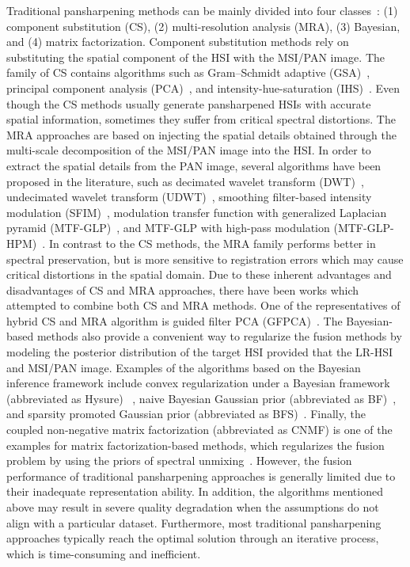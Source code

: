 \documentclass[journal]{IEEEtran}
\begin{document}
\par Traditional pansharpening methods can be mainly divided into four classes~\cite{hyperspectral_pan_review}: (1) component substitution (CS), (2) multi-resolution analysis (MRA), (3) Bayesian, and (4) matrix factorization. Component substitution methods rely on substituting the spatial component of the HSI with the MSI/PAN image. The family of CS contains algorithms such as Gram–Schmidt adaptive (GSA)~\cite{GSA, GS}, principal component analysis (PCA)~\cite{PCA_1, PCA1, PCA2}, and intensity-hue-saturation (IHS)~\cite{IHS_1}. Even though the CS methods usually generate pansharpened HSIs with accurate spatial information, sometimes they suffer from critical spectral distortions. The MRA approaches are based on injecting the spatial details obtained through the multi-scale decomposition of the MSI/PAN image into the HSI. In order to extract the spatial details from the PAN image, several algorithms have been proposed in the literature, such as decimated wavelet transform (DWT)~\cite{DWT}, undecimated wavelet transform (UDWT)~\cite{UDWT}, smoothing filter-based intensity modulation (SFIM)~\cite{SFIM}, modulation transfer function with generalized Laplacian pyramid (MTF-GLP)~\cite{MTF-GLP}, and MTF-GLP with high-pass modulation (MTF-GLP-HPM)~\cite{MTF-GLP-HPM}. In contrast to the CS methods, the MRA family performs better in spectral preservation, but is more sensitive to registration errors which may cause critical distortions in the spatial domain. Due to these inherent advantages and disadvantages of CS and MRA approaches, there have been works which attempted to  combine both CS and MRA methods. One of the representatives of hybrid CS and MRA algorithm is guided filter PCA (GFPCA)~\cite{GFPCA}. The Bayesian-based methods also provide a convenient way to regularize the fusion methods by modeling the posterior distribution of the target HSI provided that the LR-HSI and MSI/PAN image. Examples of the algorithms based on the Bayesian inference framework include convex regularization under a Bayesian framework (abbreviated as Hysure) ~\cite{hysure}, naive Bayesian Gaussian prior (abbreviated as BF)~\cite{BF}, and sparsity promoted Gaussian prior (abbreviated as BFS)~\cite{BFS}. Finally, the coupled non-negative matrix factorization (abbreviated as CNMF) is one of the examples for matrix factorization-based methods, which regularizes the fusion problem by using the priors of spectral unmixing~\cite{CNMF}. However, the fusion performance of traditional pansharpening approaches is generally limited due to their inadequate representation ability. In addition, the algorithms mentioned above may result in severe quality degradation when the assumptions do not align with a particular dataset.  Furthermore, most traditional pansharpening approaches typically reach the optimal solution through an iterative process, which is time-consuming and inefficient. 
\end{document}
